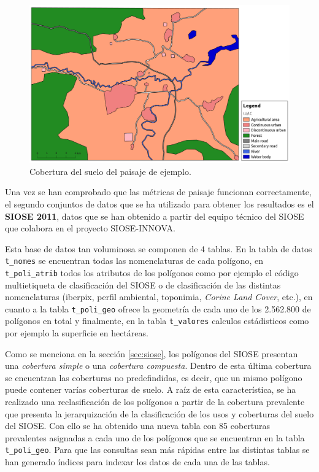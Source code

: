\begin{figure}
\begin{center}
\includegraphics[width=\textwidth]{Metodologia/Figs/zona_andrea.png}
\caption{Cobertura del suelo del paisaje de ejemplo. \label{fig:zona_andrea}}
\end{center}
\end{figure}

Una vez se han comprobado que las métricas de paisaje funcionan correctamente, el segundo conjuntos de datos que se ha utilizado para obtener los resultados es el \textbf{SIOSE 2011}, datos que se han obtenido a partir del equipo técnico del SIOSE que colabora en el proyecto SIOSE-INNOVA. 

Esta base de datos tan voluminosa se componen de 4 tablas. En la tabla de datos \texttt{t\_nomes} se encuentran todas las nomenclaturas de cada polígono, en \texttt{t\_poli\_atrib} todos los atributos de los polígonos como por ejemplo el código multietiqueta de clasificación del SIOSE o de clasificación de las distintas nomenclaturas (iberpix, perfil ambiental, toponimia, \textit{Corine Land Cover}, etc.), en cuanto a la tabla \texttt{t\_poli\_geo} ofrece la geometría de cada uno de los 2.562.800 de polígonos en total y finalmente, en la tabla \texttt{t\_valores} calculos estádisticos como por ejemplo la superficie en hectáreas.

Como se menciona en la sección \ref{sec:siose}, los polígonos del SIOSE presentan una \textit{cobertura simple} o una \textit{cobertura compuesta}. Dentro de esta última cobertura se encuentran las coberturas no predefindidas, es decir, que un mismo polígono puede contener varías coberturas de suelo. A raíz de esta característica, se ha realizado una reclasificación de los polígonos a partir de la cobertura prevalente que presenta la jerarquización de la clasificación de los usos y coberturas del suelo del SIOSE. Con ello se ha obtenido una nueva tabla con 85 coberturas prevalentes asignadas a cada uno de los polígonos que se encuentran en la tabla \texttt{t\_poli\_geo}. Para que las consultas sean más rápidas entre las distintas tablas se han generado índices para indexar los datos de cada una de las tablas. 

